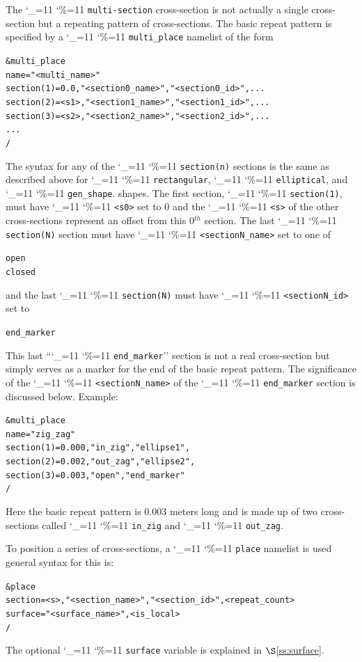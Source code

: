 \documentclass[11pt,openany]{report}
\newcommand{\sref}[1]{$\S$\ref{#1}}
\newcommand\ttcmd{\begingroup\catcode`\_=11 \catcode`\%=11 \dottcmd}
\newcommand\dottcmd[1]{\texttt{#1}\endgroup}
\newcommand{\vn}{\ttcmd}
\newcommand{\Th}{$^{th}$\xspace}
\newlength{\ExBeg}
\newlength{\ExEnd}
\newenvironment{example}
  {\vspace{\ExBeg} \begin{alltt}}
  {\end{alltt} \vspace{\ExEnd}}
\begin{document}
The \vn{multi-section} cross-section is not actually a single
cross-section but a repeating pattern of cross-sections. The basic
repeat pattern is specified by a \vn{multi_place} namelist of
the form
\begin{example}
  &multi_place
    name = "<multi_name>"
    section(1) = 0.0,  "<section0_name>", "<section0_id>", ...
    section(2) = <s1>, "<section1_name>", "<section1_id>", ...
    section(3) = <s2>, "<section2_name>", "<section2_id>", ...
    ...
  /
\end{example}
The syntax for any of the \vn{section(n)} sections is the same as
described above for \vn{rectangular}, \vn{elliptical}, and \vn{gen_shape}.
shapes. The first section, \vn{section(1)}, must
have \vn{<s0>} set to 0 and the \vn{<s>} of the other cross-sections
represent an offset from this 0\Th section. The last
\vn{section(N)} section must have \vn{<sectionN_name>} set to one of
\begin{example}
  open
  closed
\end{example}
and the last \vn{section(N)} must have \vn{<sectionN_id>} set to
\begin{example}
  end_marker
\end{example}
This last ``\vn{end_marker}'' section is not a real cross-section but
simply serves as a marker for the end of the basic repeat pattern. The
significance of the \vn{<sectionN_name>} of the \vn{end_marker} section is
discussed below. Example:
\begin{example}
  &multi_place
    name = "zig_zag"
    section(1) = 0.000, "in_zig",  "ellipse1",
    section(2) = 0.002, "out_zag", "ellipse2",
    section(3) = 0.003, "open",  "end_marker"
  /
\end{example}
Here the basic repeat pattern is 0.003 meters long and is made up of
two cross-sections called \vn{in_zig} and \vn{out_zag}.

To position a series of cross-sections, a \vn{place} namelist is used
general syntax for this is:
\begin{example}
  &place 
    section = <s>, "<section_name>", "<section_id>", <repeat_count> 
    surface = "<surface_name>", <is_local>
  /
\end{example} 
The optional \vn{surface} variable is explained in \sref{ss:surface}.
\end{document}
